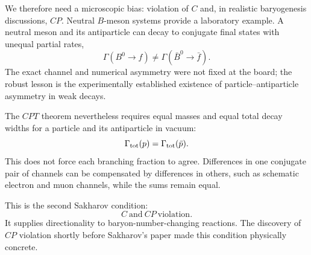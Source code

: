 \begin{classroomqa}
\end{classroomqa}

We therefore need a microscopic bias: violation of \(C\) and, in realistic baryogenesis discussions, \(CP\). Neutral \(B\)-meson systems provide a laboratory example. A neutral meson and its antiparticle can decay to conjugate final states with unequal partial rates,
\begin{equation}
\Gamma(B^0\to f)\ne\Gamma(\bar B^0\to\bar f).
\label{eq:c08-cp-partial}
\end{equation}
The exact channel and numerical asymmetry were not fixed at the board; the robust lesson is the experimentally established existence of particle--antiparticle asymmetry in weak decays.

The \(CPT\) theorem nevertheless requires equal masses and equal total decay widths for a particle and its antiparticle in vacuum:
\begin{equation}
\Gamma_{\rm tot}(p)=\Gamma_{\rm tot}(\bar p).
\end{equation}
This does not force each branching fraction to agree. Differences in one conjugate pair of channels can be compensated by differences in others, such as schematic electron and muon channels, while the sums remain equal.

\begin{classroomqa}
\end{classroomqa}

This is the second Sakharov condition:
\begin{equation}
\boxed{C\ \text{and}\ CP\ \text{violation}.}
\end{equation}
It supplies directionality to baryon-number-changing reactions. The discovery of \(CP\) violation shortly before Sakharov's paper made this condition physically concrete.


